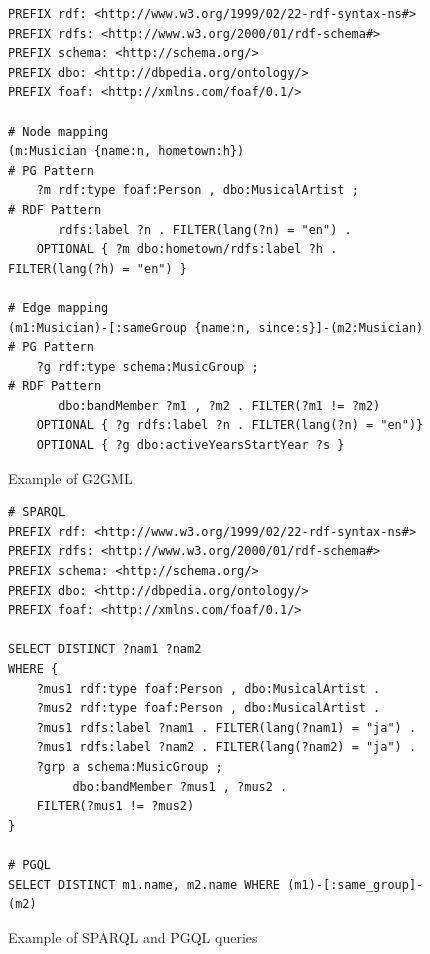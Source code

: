 \documentclass[runningheads]{llncs}
\begin{document}
\begin{figure}[!t]
\vspace{2mm}
\begin{scriptsize}
\begin{verbatim}
PREFIX rdf: <http://www.w3.org/1999/02/22-rdf-syntax-ns#>
PREFIX rdfs: <http://www.w3.org/2000/01/rdf-schema#>
PREFIX schema: <http://schema.org/>
PREFIX dbo: <http://dbpedia.org/ontology/>
PREFIX foaf: <http://xmlns.com/foaf/0.1/>
 
# Node mapping
(m:Musician {name:n, hometown:h})                            # PG Pattern
    ?m rdf:type foaf:Person , dbo:MusicalArtist ;            # RDF Pattern
       rdfs:label ?n . FILTER(lang(?n) = "en") .
    OPTIONAL { ?m dbo:hometown/rdfs:label ?h . FILTER(lang(?h) = "en") }
 
# Edge mapping
(m1:Musician)-[:sameGroup {name:n, since:s}]-(m2:Musician)  # PG Pattern
    ?g rdf:type schema:MusicGroup ;                         # RDF Pattern
       dbo:bandMember ?m1 , ?m2 . FILTER(?m1 != ?m2)
    OPTIONAL { ?g rdfs:label ?n . FILTER(lang(?n) = "en")}
    OPTIONAL { ?g dbo:activeYearsStartYear ?s }
\end{verbatim}
\end{scriptsize}
\caption{Example of G2GML}
\label{fig:g2gml}
\end{figure}
 
\begin{figure}[!t]
\vspace{2mm}
\begin{scriptsize}
\begin{verbatim}
# SPARQL
PREFIX rdf: <http://www.w3.org/1999/02/22-rdf-syntax-ns#>
PREFIX rdfs: <http://www.w3.org/2000/01/rdf-schema#>
PREFIX schema: <http://schema.org/>
PREFIX dbo: <http://dbpedia.org/ontology/>
PREFIX foaf: <http://xmlns.com/foaf/0.1/>
 
SELECT DISTINCT ?nam1 ?nam2
WHERE {
    ?mus1 rdf:type foaf:Person , dbo:MusicalArtist .
    ?mus2 rdf:type foaf:Person , dbo:MusicalArtist .
    ?mus1 rdfs:label ?nam1 . FILTER(lang(?nam1) = "ja") .
    ?mus1 rdfs:label ?nam2 . FILTER(lang(?nam2) = "ja") .
    ?grp a schema:MusicGroup ;
         dbo:bandMember ?mus1 , ?mus2 .
    FILTER(?mus1 != ?mus2)
}
 
# PGQL
SELECT DISTINCT m1.name, m2.name WHERE (m1)-[:same_group]-(m2)
\end{verbatim}
\end{scriptsize}
\caption{Example of SPARQL and PGQL queries}
\label{fig:sparql}
\end{figure}
 
\end{document}
